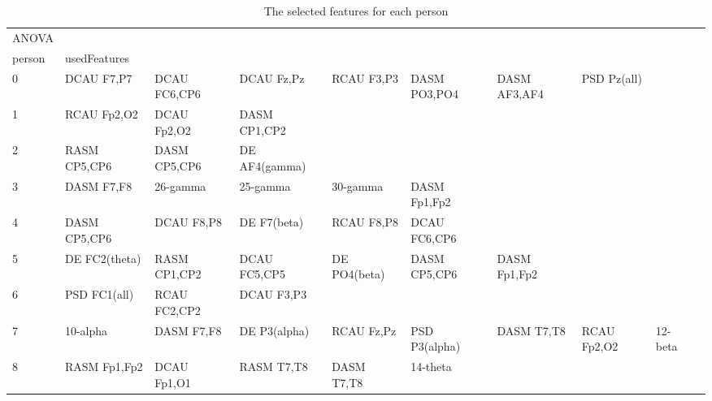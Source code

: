 \begin{landscape}
\begin{table}[]
\centering
\caption{The selected features for each person}
\begin{tabular}{l|llllllll}
ANOVA    &                &                &                &                &                &                &                &                &               &              \\
person   & usedFeatures   &                &                &                &                &                &                &                &               &              \\
0        & DCAU F7,P7     & DCAU FC6,CP6   & DCAU Fz,Pz     & RCAU F3,P3     & DASM PO3,PO4   & DASM AF3,AF4   & PSD Pz(all)    &                &               &              \\
1        & RCAU Fp2,O2    & DCAU Fp2,O2    & DASM CP1,CP2   &                &                &                &                &                &               &              \\
2        & RASM CP5,CP6   & DASM CP5,CP6   & DE AF4(gamma)  &                &                &                &                &                &               &              \\
3        & DASM F7,F8     & 26-gamma       & 25-gamma       & 30-gamma       & DASM Fp1,Fp2   &                &                &                &               &              \\
4        & DASM CP5,CP6   & DCAU F8,P8     & DE F7(beta)    & RCAU F8,P8     & DCAU FC6,CP6   &                &                &                &               &              \\
5        & DE FC2(theta)  & RASM CP1,CP2   & DCAU FC5,CP5   & DE PO4(beta)   & DASM CP5,CP6   & DASM Fp1,Fp2   &                &                &               &              \\
6        & PSD FC1(all)   & RCAU FC2,CP2   & DCAU F3,P3     &                &                &                &                &                &               &              \\
7        & 10-alpha       & DASM F7,F8     & DE P3(alpha)   & RCAU Fz,Pz     & PSD P3(alpha)  & DASM T7,T8     & RCAU Fp2,O2    & 12-beta        &               &              \\
8        & RASM Fp1,Fp2   & DCAU Fp1,O1    & RASM T7,T8     & DASM T7,T8     & 14-theta       &                &                &                &               &              \\

\end{tabular}
\end{table}
\end{landscape}
